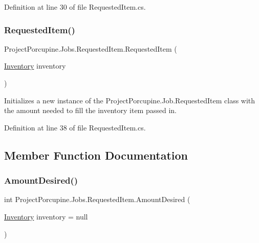 Definition at line 30 of file Requested\+Item.\+cs.

\mbox{\label{class_project_porcupine_1_1_jobs_1_1_requested_item_a38228f96b2d55fb0e2bc120ad9f6a4fb}} 
\subsubsection{\texorpdfstring{Requested\+Item()}{RequestedItem()}\hspace{0.1cm}{\footnotesize\ttfamily [4/4]}}
{\footnotesize\ttfamily Project\+Porcupine.\+Jobs.\+Requested\+Item.\+Requested\+Item (\begin{DoxyParamCaption}\item[{\hyperlink{class_inventory}{Inventory}}]{inventory }\end{DoxyParamCaption})}



Initializes a new instance of the Project\+Porcupine.\+Job.\+Requested\+Item class with the amount needed to fill the inventory item passed in. 



Definition at line 38 of file Requested\+Item.\+cs.



\subsection{Member Function Documentation}
\mbox{\label{class_project_porcupine_1_1_jobs_1_1_requested_item_a71d5c8e133ad4bccb7d0c68ed44fc317}} 
\subsubsection{\texorpdfstring{Amount\+Desired()}{AmountDesired()}}
{\footnotesize\ttfamily int Project\+Porcupine.\+Jobs.\+Requested\+Item.\+Amount\+Desired (\begin{DoxyParamCaption}\item[{\hyperlink{class_inventory}{Inventory}}]{inventory = {\ttfamily null} }\end{DoxyParamCaption})}



